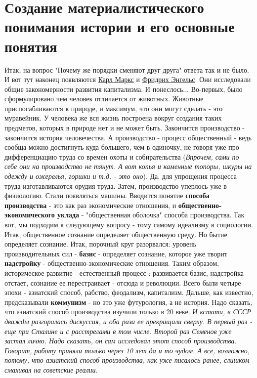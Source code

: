 \section{Создание материалистического понимания истории и его основные понятия}
Итак, на вопрос "Почему же порядки сменяют друг друга" ответа так и не было. И вот тут наконец появляются \underline{Карл Маркс} и \underline{Фридрих Энгельс}. Они исследовали общие закономерности развития капитализма. И понеслось... Во-первых, было сформулировано чем человек отличается от животных. Животные приспосабливаются к природе, и максимум, что они могут сделать - это муравейник. У человека же вся жизнь построена вокруг создания таких предметов, которых в природе нет и не может быть. Закончится производство - закончится история человечества. А производство - процесс общественный - ведь сообща можно достигнуть куда большего, чем в одиночку, не говоря уже про дифференциацию труда со времен охоты и собирательства (\textit{Впрочем, сами по себе они на производство не тянут. А вот копья и каменные топоры, шкуры на одежду и ожерелья, горшки и т.д.  - это оно}). Да, для упрощения процесса труда изготавливаются орудия труда. Затем, производство уперлось уже в физиологию. Стали появляться машины. Вводится понятие \textbf{способа производства} - это как раз экономические отношения, и \textbf{общественно-экономического уклада} - "общественная оболочка" способа производства. Так вот, мы подходим к следующему вопросу - тому самому идеализму в социологии. Итак, общественное сознание определяет общественную среду. Но бытие определяет сознание. Итак, порочный круг разорвался: уровень производительных сил - \textbf{базис} - определяет сознание, которое уже творит \textbf{надстройку} - общественно-экономические отношения. Таким образом, историческое развитие - естественный процесс : развивается базис, надстройка отстает, сознание ее перестраивает - отсюда и революции. Всего были четыре эпохи - азиатский способ, рабство, феодализм, капитализм. Дальше, как известно, предсказывали \textbf{коммунизм}  - но это уже футурология, а не история. Надо сказать, что азиатский способ производства изучили только в 20 веке. \textit{И кстати, в СССР  дважды разгоралась дискуссия, и оба раза ее прекращали сверху. В первый раз - еще при Сталине и с расстрелами в том числе. Второй раз Семенов уже застал лично. Надо сказать, он сам исследовал этот способ производства. Говорит, работу приняли только через 10 лет да и то чудом. А все, возможно, потому, что азиатский способ производства, как уже писалось ранее, слишком смахивал на советские реалии}.

